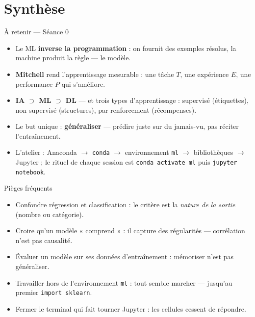 \documentclass[aspectratio=169,11pt]{beamer}
\begin{document}
\section{Synthèse}

\begin{frame}{À retenir — Séance 0}
\begin{ucadret}[L'essentiel]
\begin{itemize}\small
  \item Le ML \textbf{inverse la programmation} : on fournit des exemples résolus, la machine produit la règle — le modèle.
  \item \textbf{Mitchell} rend l'apprentissage mesurable : une tâche $T$, une expérience $E$, une performance $P$ qui s'améliore.
  \item \textbf{IA $\supset$ ML $\supset$ DL} — et trois types d'apprentissage : supervisé (étiquettes), non supervisé (structures), par renforcement (récompenses).
  \item Le but unique : \textbf{généraliser} — prédire juste sur du jamais-vu, pas réciter l'entraînement.
  \item L'atelier : Anaconda $\to$ \texttt{conda} $\to$ environnement \texttt{ml} $\to$ bibliothèques $\to$ Jupyter ; le rituel de chaque session est \texttt{conda activate ml} puis \texttt{jupyter notebook}.
\end{itemize}
\end{ucadret}
\end{frame}

\begin{frame}{Pièges fréquents}
\begin{itemize}\small
  \item Confondre régression et classification : le critère est la \emph{nature de la sortie} (nombre ou catégorie).
  \item Croire qu'un modèle « comprend » : il capture des régularités — corrélation n'est pas causalité.
  \item Évaluer un modèle sur ses données d'entraînement : mémoriser n'est pas généraliser.
  \item Travailler hors de l'environnement \texttt{ml} : tout semble marcher — jusqu'au premier \texttt{import sklearn}.
  \item Fermer le terminal qui fait tourner Jupyter : les cellules cessent de répondre.
\end{itemize}
\end{frame}
\end{document}
